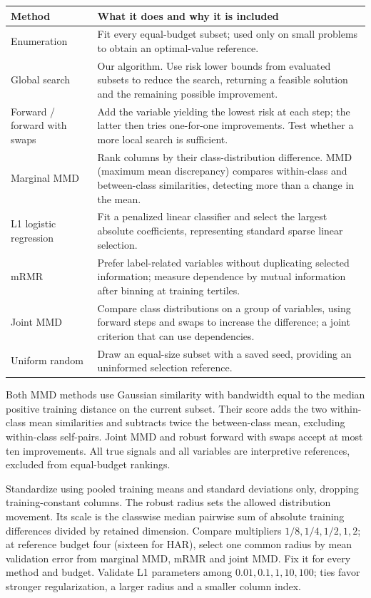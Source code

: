 \documentclass[11pt,a4paper]{article}
\newcommand{\topic}[1]{\par\vspace{8pt}{\large\bfseries\color{ink}#1}\par\vspace{2pt}}
\begin{document}
{\small\begin{tabularx}{\linewidth}{@{}P{32mm}X@{}}\toprule
Method & What it does and why it is included\\\midrule
Enumeration & Fit every equal-budget subset; used only on small problems to obtain an optimal-value reference.\\
Global search & Our algorithm. Use risk lower bounds from evaluated subsets to reduce the search, returning a feasible solution and the remaining possible improvement.\\
Forward / forward with swaps & Add the variable yielding the lowest risk at each step; the latter then tries one-for-one improvements. Test whether a more local search is sufficient.\\
Marginal MMD & Rank columns by their class-distribution difference. MMD (maximum mean discrepancy) compares within-class and between-class similarities, detecting more than a change in the mean.\\
L1 logistic regression & Fit a penalized linear classifier and select the largest absolute coefficients, representing standard sparse linear selection.\\
mRMR & Prefer label-related variables without duplicating selected information; measure dependence by mutual information after binning at training tertiles.\\
Joint MMD & Compare class distributions on a group of variables, using forward steps and swaps to increase the difference; a joint criterion that can use dependencies.\\
Uniform random & Draw an equal-size subset with a saved seed, providing an uninformed selection reference.\\
\bottomrule\end{tabularx}}
Both MMD methods use Gaussian similarity with bandwidth equal to the median positive training distance on the current subset. Their score adds the two within-class mean similarities and subtracts twice the between-class mean, excluding within-class self-pairs. Joint MMD and robust forward with swaps accept at most ten improvements. All true signals and all variables are interpretive references, excluded from equal-budget rankings.

\topic{Parameter selection never accesses test data}
Standardize using pooled training means and standard deviations only, dropping training-constant columns. The robust radius sets the allowed distribution movement. Its scale is the classwise median pairwise sum of absolute training differences divided by retained dimension. Compare multipliers $1/8,1/4,1/2,1,2$; at reference budget four (sixteen for HAR), select one common radius by mean validation error from marginal MMD, mRMR and joint MMD. Fix it for every method and budget. Validate L1 parameters among $0.01,0.1,1,10,100$; ties favor stronger regularization, a larger radius and a smaller column index.
\end{document}
